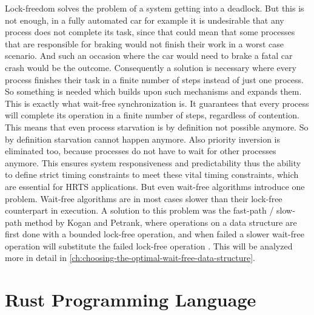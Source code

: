 Lock-freedom solves the problem of a system getting into a deadlock. But this is not enough, in a fully automated car for example it is undesirable that any process does not complete its task, since that could mean that some processes that are responsible for braking would not finish their work in a worst case scenario. And such an occasion where the car would need to brake a fatal car crash would be the outcome. Consequently a solution is necessary where every process finishes their task in a finite number of steps instead of just one process. So something is needed which builds upon such mechanisms and expands them. This is exactly what wait-free synchronization is. It guarantees that every process will complete its operation in a finite number of steps, regardless of contention. This means that even process starvation is by definition not possible anymore. So by definition starvation cannot happen anymore. Also priority inversion is eliminated too, because processes do not have to wait for other processes anymore. This ensures system responsiveness and predictability thus the ability to define strict timing constraints to meet these vital timing constraints, which are essential for \ac{HRTS} applications. But even wait-free algorithms introduce one problem. Wait-free algorithms are in most cases slower than their lock-free counterpart in execution. A solution to this problem was the fast-path / slow-path method by Kogan and Petrank, where operations on a data structure are first done with a bounded lock-free operation, and when failed a slower wait-free operation will substitute the failed lock-free operation \cite{kogan2012methodology}. This will be analyzed more in detail in \cref{ch:choosing-the-optimal-wait-free-data-structure}.

\section{Rust Programming Language}\label{sec:rust}

